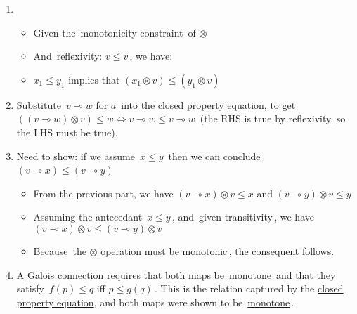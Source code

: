 \begin{enumerate}
    \item
          \begin{itemize}
            \item Given the \,monotonicity constraint\, of $\otimes$
            \item And \,reflexivity: $v \leq v$\,, we have:
            \item $x_1 \leq y_1$ implies that $(x_1 \otimes v) \leq (y_1 \otimes v)$
          \end{itemize}
    \item Substitute \,$v \multimap w$ for $a$\, into the \hyperref[D2.79]{closed property equation}, to get \,$((v \multimap w)\otimes v) \leq w \iff v \multimap w \leq v \multimap w$\, (the RHS is true by reflexivity, so the LHS must be true).
    \item Need to show: if we assume \,$x \leq y$\, then we can conclude \,$(v \multimap x) \leq (v \multimap y)$\,
          \begin{itemize}
            \item From the previous part, we have $(v \multimap x) \otimes v \leq x$ and $(v \multimap y) \otimes v \leq y$
            \item Assuming the antecedant \,$x \leq y$\,, and \,given transitivity\,, we have $(v \multimap x) \otimes v \leq (v \multimap y) \otimes v$
            \item Because \,the $\otimes$ operation must be \hyperref[D2.2]{monotonic}\,, the consequent follows.
          \end{itemize}
    \item A \hyperref[D1.95]{Galois connection} requires that both maps be \,\hyperref[D1.59]{monotone}\, and that they satisfy \,$f(p)\leq q$ iff $p \leq g(q)$\,. This is the relation captured by the \hyperref[D2.79]{closed property equation}, and both maps were shown to be \,\hyperref[D1.59]{monotone}\,.
  \end{enumerate}
